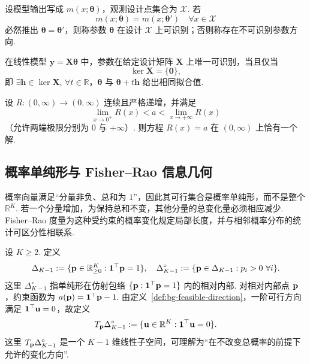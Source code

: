 \begin{definition}[参数的结构可识别性]\label{def:bg-identifiability}
设模型输出写成 $m(x;\boldsymbol\theta)$，观测设计点集合为 $\mathcal X$. 若
\[
m(x;\boldsymbol\theta)=m(x;\boldsymbol\theta')\quad\forall x\in\mathcal X
\]
必然推出 $\boldsymbol\theta=\boldsymbol\theta'$，则称参数 $\boldsymbol\theta$ 在设计 $\mathcal X$ 上可识别；否则称存在不可识别参数方向. 
\end{definition}

\begin{proposition}[线性参数模型的秩判据]\label{prop:bg-linear-identifiability}
在线性模型 $\mathbf y=\mathbf X\boldsymbol\theta$ 中，参数在给定设计矩阵 $\mathbf X$ 上唯一可识别，当且仅当
\[
\ker\mathbf X=\{\mathbf0\},
\]
即 $ \exists \mathbf h\in\ker\mathbf X$, $\forall t \in \mathbb{R}$，$\boldsymbol\theta$ 与 $\boldsymbol\theta+t\mathbf h$ 给出相同拟合值. 
\end{proposition}

\begin{lemma}[连续单调方程的唯一根]\label{lem:bg-monotone-root}
设 $R:(0,\infty)\to(0,\infty)$ 连续且严格递增，并满足
\[
\lim_{x\to0^+}R(x)<a<\lim_{x\to+\infty}R(x)
\]
（允许两端极限分别为 $0$ 与 $+\infty$）. 则方程 $R(x)=a$ 在 $(0,\infty)$ 上恰有一个解. 
\end{lemma}

\subsection{概率单纯形与 Fisher--Rao 信息几何}\label{sec:bg-info-geometry}

概率向量满足“分量非负、总和为 $1$”，因此其可行集合是概率单纯形，而不是整个 $\mathbb R^K$. 若一个分量增加，为保持总和不变，其他分量的总变化量必须相应减少. Fisher--Rao 度量为这种受约束的概率变化规定局部长度，并与相邻概率分布的统计可区分性相联系. 

\begin{definition}[概率单纯形及其相对内部]\label{def:background-simplex}
设 $K\ge2$. 定义
\[
\Delta_{K-1}:=\{\mathbf p\in\mathbb R_{\ge0}^{K}:\mathbf 1^\top\mathbf p=1\},
\quad
\Delta_{K-1}^{\circ}:=\{\mathbf p\in\Delta_{K-1}:p_i>0\ \forall i\}.
\]
这里 $\Delta_{K-1}^{\circ}$ 指单纯形在仿射包络 $\{\mathbf p:\mathbf 1^\top\mathbf p=1\}$ 内的相对内部. 对相对内部点 $\mathbf p$，约束函数为 $a(\mathbf p)=\mathbf 1^\top\mathbf p-1$. 由定义~\ref{def:bg-feasible-direction}，一阶可行方向满足 $\mathbf 1^\top\mathbf u=0$，故定义
\[
T_{\mathbf p}\Delta_{K-1}^{\circ}
:=\{\mathbf u\in\mathbb R^K:\mathbf 1^\top\mathbf u=0\}.
\]
这里 $T_{\mathbf p}\Delta_{K-1}^{\circ}$ 是一个 $K-1$ 维线性子空间，可理解为“在不改变总概率的前提下允许的变化方向”. 
\end{definition}

